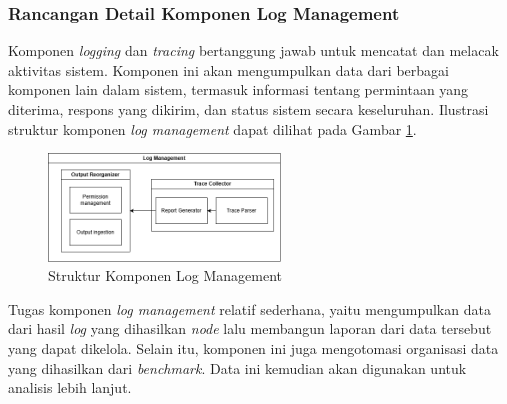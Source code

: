 \subsubsection{Rancangan Detail Komponen Log Management}
\label{subsubsection:detail-data-log-management}

Komponen \textit{logging} dan \textit{tracing} bertanggung jawab untuk mencatat dan melacak aktivitas sistem. Komponen ini akan mengumpulkan data dari berbagai komponen lain dalam sistem, termasuk informasi tentang permintaan yang diterima, respons yang dikirim, dan status sistem secara keseluruhan. Ilustrasi struktur komponen \textit{log management} dapat dilihat pada Gambar \ref{fig:log-management-structure}.

\begin{figure}[ht]
    \centering
    \includegraphics[width=0.55\textwidth]{resources/chapter-3/log-management-architecture.png}
    \caption{Struktur Komponen Log Management}
    \label{fig:log-management-structure}
\end{figure}

Tugas komponen \textit{log management} relatif sederhana, yaitu mengumpulkan data dari hasil \textit{log} yang dihasilkan \textit{node} lalu membangun laporan dari data tersebut yang dapat dikelola. Selain itu, komponen ini juga mengotomasi organisasi data yang dihasilkan dari \textit{benchmark}. Data ini kemudian akan digunakan untuk analisis lebih lanjut.